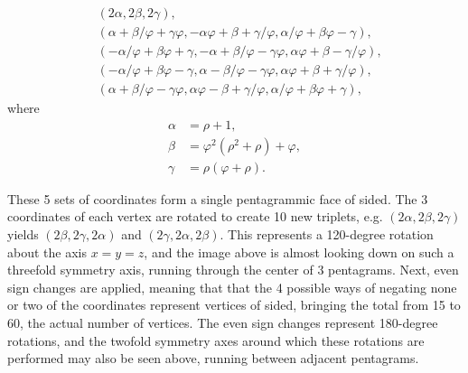 \documentclass{article}
\begin{document}
\begin{align*}
  & (2\alpha, 2\beta, 2\gamma), \\
  & (\alpha+\beta/\varphi+\gamma\varphi,
  -\alpha\varphi+\beta+\gamma/\varphi,
  \alpha/\varphi+\beta\varphi-\gamma), \\
  & (-\alpha/\varphi+\beta\varphi+\gamma,
  -\alpha+\beta/\varphi-\gamma\varphi,
  \alpha\varphi+\beta-\gamma/\varphi), \\
  & (-\alpha/\varphi+\beta\varphi-\gamma,
  \alpha-\beta/\varphi-\gamma\varphi,
  \alpha\varphi+\beta+\gamma/\varphi), \\
  & (\alpha+\beta/\varphi-\gamma\varphi,
  \alpha\varphi-\beta+\gamma/\varphi,
  \alpha/\varphi+\beta\varphi+\gamma),
\end{align*}
where
\begin{align*}
  \alpha &= \rho+1, \\
  \beta &= \varphi^2(\rho^2+\rho)+\varphi, \\
  \gamma &= \rho(\varphi+\rho).
\end{align*}

These 5 sets of coordinates form a single pentagrammic face of sided.
The 3 coordinates of each vertex are rotated to create 10 new triplets,
e.g. $(2\alpha, 2\beta, 2\gamma)$ yields
$(2\beta, 2\gamma, 2\alpha)$ and $(2\gamma, 2\alpha, 2\beta)$.
This represents a 120-degree rotation about the axis $x=y=z$,
and the image above is almost looking down on such a threefold symmetry axis,
running through the center of 3 pentagrams.
Next, even sign changes are applied,
meaning that that the 4 possible ways of negating none or two of the coordinates
represent vertices of sided,
bringing the total from 15 to 60, the actual number of vertices.
The even sign changes represent 180-degree rotations,
and the twofold symmetry axes around which these rotations are performed
may also be seen above, running between adjacent pentagrams.
\end{document}
